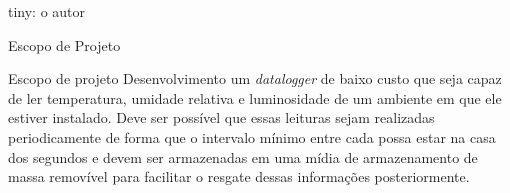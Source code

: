 \begin{frame}
\begin{table}[!h]
        	\captionsetup{width=7cm}%
        	\caption{\textit{Dataloggers: Propriedades}}%
        	\resizebox{\linewidth}{!}{
        		\begin{tabular}{ccccccc}
        			\toprule
        			Modelo & Dimensões & Autonomia & Faixa de Leitura (ºC) & Precisão (ºC) & Umidade Relativa (\%) & Precisão(\%)\\
        			\midrule \midrule
                   RCW-360        & Não informado   & 3 meses       & -35 a 80 & 0,5 & 0 a 99 & 5    \\
                   EL-WiFi-TH     & 82 x 70 x 23 mm & 6 meses       & -20 a 60 & 0,3 & 0 a 100 & 2    \\
                   TandD RTR-507B & 62 x 47 x 19 mm & 10 meses      & -25 a 70 & 0,3 & 0 a 99  & 2,50 \\
                   160 TH         & 76 x 64 x 22 mm & Não informado & -30 a 50 & 0,1 & 0 a 100 & 2   
                    \\
        	    \bottomrule
        		\end{tabular}%
        	}
                \tiny{tiny: o autor}\\
            \end{table}
\end{frame}

\begin{frame}{Escopo de Projeto}

    \begin{block}{Escopo de projeto}
        Desenvolvimento um \textit{datalogger} de baixo custo que seja capaz de ler temperatura, umidade relativa e luminosidade de um ambiente em que ele estiver instalado. Deve ser possível que essas leituras sejam realizadas periodicamente de forma que o intervalo mínimo entre cada possa estar na casa dos segundos e devem ser armazenadas em uma mídia de armazenamento de massa removível para facilitar o resgate dessas informações posteriormente.
    \end{block}
    
\end{frame}





